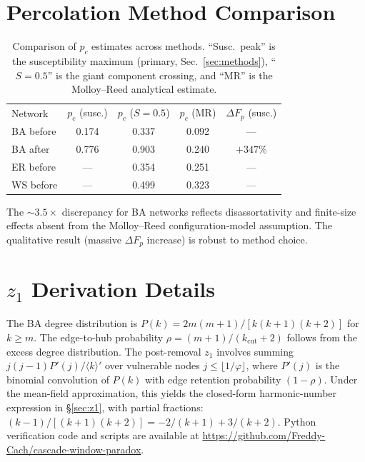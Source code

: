 \documentclass[aps,pre,twocolumn,superscriptaddress,showpacs]{revtex4-2}
\newcommand{\avg}[1]{\langle #1 \rangle}
\newcommand{\pc}{p_c}
\newcommand{\DF}{\Delta F}
\newcommand{\kcut}{k_{\text{cut}}}
\begin{document}
\section{Percolation Method Comparison}
\label{app:percolation}

\begin{table}[h]
\caption{Comparison of $\pc$ estimates across methods. ``Susc.\ peak'' is the susceptibility maximum (primary, Sec.~\ref{sec:methods}), ``$S=0.5$'' is the giant component crossing, and ``MR'' is the Molloy--Reed analytical estimate.}
\label{tab:pc_compare}
\begin{ruledtabular}
\begin{tabular}{lcccc}
\textrm{Network} & $\pc$ (susc.) & $\pc$ ($S=0.5$) & $\pc$ (MR) & $\DF_p$ (susc.) \\
\colrule
BA before & 0.174 & 0.337 & 0.092 & --- \\
BA after & 0.776 & 0.903 & 0.240 & $+347\%$ \\
ER before & --- & 0.354 & 0.251 & --- \\
WS before & --- & 0.499 & 0.323 & --- \\
\end{tabular}
\end{ruledtabular}
\end{table}

The ${\sim}3.5\times$ discrepancy for BA networks reflects disassortativity and finite-size effects absent from the Molloy--Reed configuration-model assumption. The qualitative result (massive $\DF_p$ increase) is robust to method choice.

\section{$z_1$ Derivation Details}
\label{app:z1}

The BA degree distribution is $P(k) = 2m(m+1)/[k(k+1)(k+2)]$ for $k \geq m$. The edge-to-hub probability $\rho = (m+1)/(\kcut+2)$ follows from the excess degree distribution. The post-removal $z_1$ involves summing $j(j-1)P'(j)/\avg{k}'$ over vulnerable nodes $j \leq \lfloor 1/\varphi \rfloor$, where $P'(j)$ is the binomial convolution of $P(k)$ with edge retention probability $(1-\rho)$. Under the mean-field approximation, this yields the closed-form harmonic-number expression in \S\ref{sec:z1}, with partial fractions: $(k-1)/[(k+1)(k+2)] = -2/(k+1) + 3/(k+2)$. Python verification code and scripts are available at \url{https://github.com/Freddy-Cach/cascade-window-paradox}.
\end{document}
